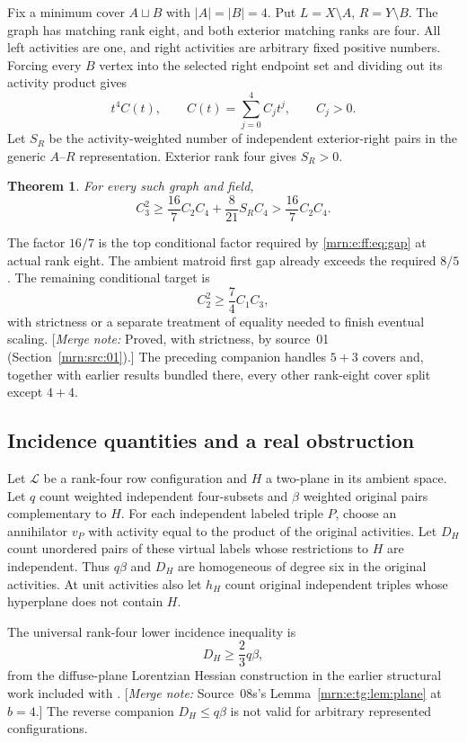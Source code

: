 \documentclass[11pt,a4paper]{article}
\newtheorem{theorem}{Theorem}[section]
\theoremstyle{remark}\newtheorem{remark}[theorem]{Remark}
\newcommand{\mnote}[1]{[\textit{Merge note:} #1]}
\begin{document}
Fix a minimum cover $A\sqcup B$ with $|A|=|B|=4$. Put $L=X\setminus A$, $R=Y\setminus B$. The graph has matching rank eight, and both exterior matching ranks are four. All left activities are one, and right activities are arbitrary fixed positive numbers. Forcing every $B$ vertex into the selected right endpoint set and dividing out its activity product gives
\[
 t^4 C(t),\qquad C(t)=\sum_{j=0}^4C_jt^j,\qquad C_j>0.
\]
Let $S_R$ be the activity-weighted number of independent exterior-right pairs in the generic $A$--$R$ representation. Exterior rank four gives $S_R>0$.

\begin{theorem}\label{mrn:e:ff:thm:top}
For every such graph and field,
\begin{equation}\label{mrn:e:ff:eq:top}
 C_3^2\ge\frac{16}{7}C_2C_4+\frac8{21}S_RC_4
 >\frac{16}{7}C_2C_4.
\end{equation}
\end{theorem}
The factor $16/7$ is the top conditional factor required by \eqref{mrn:e:ff:eq:gap} at actual rank eight. The ambient matroid first gap already exceeds the required $8/5$. The remaining conditional target is
\begin{equation}\label{mrn:e:ff:eq:open}
 C_2^2\ge\frac74C_1C_3,
\end{equation}
with strictness or a separate treatment of equality needed to finish eventual scaling. \mnote{Proved, with strictness, by source~01 (Section~\ref{mrn:src:01}).} The preceding companion \cite{b:m03} handles $5+3$ covers and, together with earlier results bundled there, every other rank-eight cover split except $4+4$.

\subsection{Incidence quantities and a real obstruction}
Let $\mathcal L$ be a rank-four row configuration and $H$ a two-plane in its ambient space. Let $q$ count weighted independent four-subsets and $\beta$ weighted original pairs complementary to $H$. For each independent labeled triple $P$, choose an annihilator $v_P$ with activity equal to the product of the original activities. Let $D_H$ count unordered pairs of these virtual labels whose restrictions to $H$ are independent. Thus $q\beta$ and $D_H$ are homogeneous of degree six in the original activities. At unit activities also let $h_H$ count original independent triples whose hyperplane does not contain $H$.

The universal rank-four lower incidence inequality is
\[
 D_H\ge\frac23q\beta,
\]
from the diffuse-plane Lorentzian Hessian construction in the earlier structural work included with \cite{b:m03}. \mnote{Source~08s's Lemma~\ref{mrn:e:tg:lem:plane} at $b=4$.} The reverse companion $D_H\le q\beta$ is not valid for arbitrary represented configurations.
\end{document}
